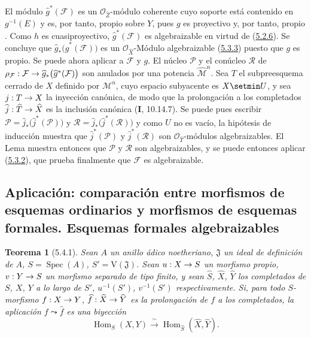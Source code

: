 \documentclass[10pt,oneside,openany]{book}
\theoremstyle{egaenv}\newtheorem*{env}{---}
\theoremstyle{egastatement}
\newtheorem*{theorem}{Teorema}
\theoremstyle{egadescription}
\newcommand{\oldpage}[2][]{\marginnote{\normalfont\scriptsize\textbf{#1}\,|\,#2}\ignorespaces}
\renewcommand{\to}{\mathchoice{\longrightarrow}{\rightarrow}{\rightarrow}{\rightarrow}}
\begin{document}
El módulo $\widehat g^{*}(\mathcal F)$ es un
$\mathcal O_{\widehat Z}$-módulo coherente cuyo soporte está contenido en
$g^{-1}(E)$ y es, por tanto, propio sobre $Y$, pues $g$ es
proyectivo y, por tanto, propio . Como $h$ es
cuasiproyectivo, $\widehat g^{*}(\mathcal F)$ es
algebraizable en virtud de (\hyperref[III.5.2.6-fr]{5.2.6}). Se concluye
\oldpage[III]{156}
que $\widehat g_*\bigl(\widehat g^{*}(\mathcal F)\bigr)$
es un $\mathcal O_{\widehat X}$-Módulo algebraizable
(\hyperref[III.5.3.3-fr]{5.3.3}) puesto que $g$ es propio. Se puede ahora
aplicar a $\mathcal F$ y $g$. El núcleo $\mathcal P$
y el conúcleo $\mathcal R$ de
$\rho_{\mathcal F}:\mathcal F\to
\widehat g_*\bigl(\widehat g^{*}(\mathcal F)\bigr)$
son anulados por una potencia $\widehat{\mathcal M}^{n}$. Sea $T$
el subpreesquema cerrado de $X$ definido por $\mathcal M^n$, cuyo
espacio subyacente es $X\setmin U$, y sea $j:T\to X$ la inyección canónica, de modo que la prolongación a los completados $\widehat j:\widehat T\to\widehat X$ es la inclusión canónica (\textbf{I}, 10.14.7). Se
puede pues escribir
$\mathcal P=\widehat j_*\bigl(\widehat j^{*}(\mathcal P)\bigr)$ y
$\mathcal R=\widehat j_*\bigl(\widehat j^{*}(\mathcal R)\bigr)$ y como $U$ no es vacío, la hipótesis de inducción muestra que
$\widehat j^{*}(\mathcal P)$ y
$\widehat j^{*}(\mathcal R)$ son $\mathcal O_{\widehat T}$-módulos
algebraizables. El Lema  muestra entonces
que $\mathcal P$ y $\mathcal R$ son algebraizables, y se puede entonces aplicar (\hyperref[III.5.3.2-fr]{5.3.2}), que prueba finalmente que $\mathcal F$ es algebraizable.



\subsection{Aplicación: comparación entre morfismos de esquemas ordinarios y morfismos de esquemas formales. Esquemas formales algebraizables}
\label{subsection:III.5.4}
\label{subsection:III.5.4-fr}

\begin{theorem}[5.4.1]
\label{III.5.4.1-fr}
Sean $A$ un anillo ádico noetheriano, $\mathfrak J$ un ideal de definición de
$A$, $S=\operatorname{Spec}(A)$, $S'=\mathrm V(\mathfrak J)$. Sean
$u:X\to S$ un morfismo propio, $v:Y\to S$ un morfismo separado de tipo finito, y
sean $\widehat S$, $\widehat X$, $\widehat Y$ los completados de $S$, $X$, $Y$ a lo
largo de $S'$, $u^{-1}(S')$, $v^{-1}(S')$ respectivamente. Si, para todo
$S$-morfismo $f:X\to Y$, $\widehat f:\widehat X\to\widehat Y$ es la
prolongación de $f$ a los completados, la aplicación $f\leadsto\widehat f$ es una
biyección
\[
\operatorname{Hom}_S(X,Y)\xrightarrow{\ \sim\ }
\operatorname{Hom}_{\widehat S}(\widehat X,\widehat Y).
\]
\end{theorem}
\end{document}
